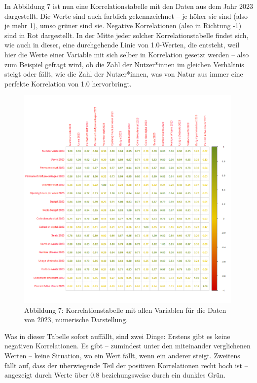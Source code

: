 \documentclass[a4paper,
fontsize=11pt,
oneside,
numbers=noperiodatend,
parskip=half-,
bibliography=totoc,
final
]{scrartcl}
\begin{document}
In Abbildung 7 ist nun eine Korrelationstabelle mit den Daten aus dem
Jahr 2023 dargestellt. Die Werte sind auch farblich gekennzeichnet -- je
höher sie sind (also je mehr 1), umso grüner sind sie. Negative
Korrelationen (also in Richtung -1) sind in Rot dargestellt. In der
Mitte jeder solcher Korrelationstabelle findet sich, wie auch in dieser,
eine durchgehende Linie von 1.0-Werten, die entsteht, weil hier die
Werte einer Variable mit sich selber in Korrelation gesetzt werden --
also zum Beispiel gefragt wird, ob die Zahl der Nutzer*innen im gleichen
Verhältnis steigt oder fällt, wie die Zahl der Nutzer*innen, was von
Natur aus immer eine perfekte Korrelation von 1.0 hervorbringt.

\begin{figure}
\centering
\includegraphics[width=0.99\textwidth]{img/Abbildung07.PNG}
\caption{Abbildung 7: Korrelationstabelle mit allen Variablen für die
Daten von 2023, numerische Darstellung.}
\end{figure}

Was in dieser Tabelle sofort auffällt, sind zwei Dinge: Erstens gibt es
keine negativen Korrelationen. Es gibt -- zumindest unter den
miteinander verglichenen Werten -- keine Situation, wo ein Wert fällt,
wenn ein anderer steigt. Zweitens fällt auf, dass der überwiegende Teil
der positiven Korrelationen recht hoch ist -- angezeigt durch Werte über
0.8 beziehungsweise durch ein dunkles Grün.
\end{document}
